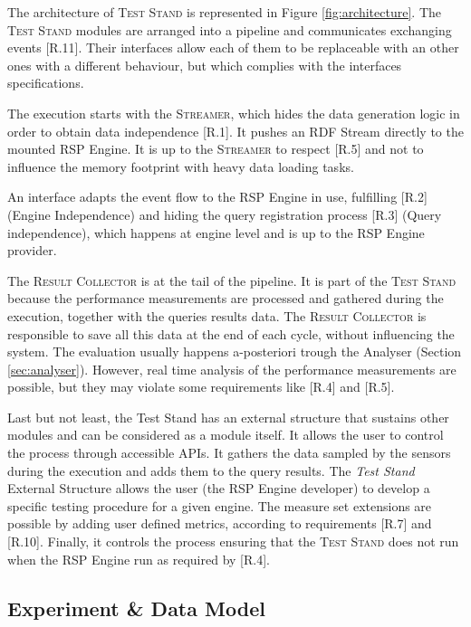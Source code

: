 \noindent The architecture of \name \textsc{Test Stand} is represented in Figure \ref{fig:architecture}. The \textsc{Test Stand} modules  are arranged into a pipeline and communicates exchanging events [R.11]. Their interfaces allow each of them to be replaceable with an other ones with a different behaviour, but which complies with the interfaces specifications.

The execution starts with the \textsc{Streamer}, which hides the data generation logic in order to obtain data independence [R.1]. It pushes an RDF Stream directly to the mounted RSP Engine. It is up to the \textsc{Streamer} to respect [R.5] and not to influence the memory footprint with heavy data loading tasks. 

An interface adapts the event flow to the RSP Engine in use, fulfilling [R.2] (Engine Independence) and hiding the query registration process [R.3] (Query independence), which happens at engine level and is up to the RSP Engine provider.

The \textsc{Result Collector} is at the tail of the pipeline. It is part of the \textsc{Test Stand} because the performance measurements are processed and gathered during the execution, together with the queries results data. The \textsc{Result Collector} is responsible to save all this data at the end of each cycle, without influencing the system. The evaluation usually happens a-posteriori trough the Analyser (Section \ref{sec:analyser}). However, real time analysis of the performance measurements are possible, but they may violate some requirements like [R.4] and [R.5]. 

Last but not least, the Test Stand has an external structure that sustains other modules and can be considered as a module itself. It allows the user to control the process through accessible APIs. It gathers the data sampled by the sensors during the execution and adds them to the query results. The \textit{Test Stand} External Structure allows the user (the RSP Engine developer) to develop a specific testing procedure for a given engine. The measure set extensions are possible by adding user defined metrics, according to requirements [R.7] and [R.10]. Finally, it controls the process ensuring that the \textsc{Test Stand} does not run when the RSP Engine run as required by [R.4].

\subsection{Experiment \& Data Model}\label{sec:test-stand-data-model}

